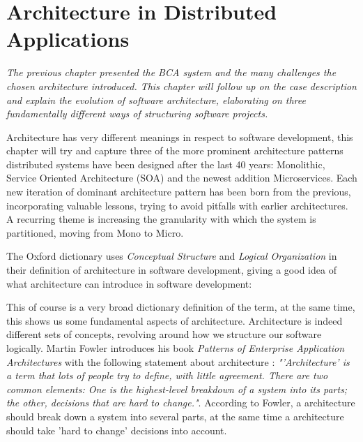 \chapter{Architecture in Distributed Applications}
\label{ch:architecture}

\textit{The previous chapter presented the BCA system and the many challenges the chosen architecture introduced. This chapter will follow up on the case description and explain the evolution of software architecture, elaborating on three fundamentally different ways of structuring software projects.}

Architecture has very different meanings in respect to software development, this chapter will try and capture three of the more prominent architecture patterns distributed systems have been designed after the last 40 years: Monolithic, Service Oriented Architecture (SOA) and the newest addition Microservices. Each new iteration of dominant architecture pattern has been born from the previous, incorporating valuable lessons, trying to avoid pitfalls with earlier architectures. A recurring theme is increasing the granularity with which the system is partitioned, moving from Mono to Micro.

The Oxford dictionary uses \textit{Conceptual Structure} and \textit{Logical Organization} in their definition of architecture in software development, giving a good idea of what architecture can introduce in software development:
 
 
This of course is a very broad dictionary definition of the term, at the same time, this shows us some fundamental aspects of architecture. Architecture is indeed different sets of concepts, revolving around how we structure our software logically. Martin Fowler introduces his book \textit{Patterns of Enterprise Application Architectures} with the following statement about architecture \cite[p.~1]{fowler2002patterns}: \textit{"'Architecture' is a term that lots of people try to define, with little agreement. There are two common elements: One is the highest-level breakdown of a system into its parts; the other, decisions that are hard to change."}. According to Fowler, a architecture should break down a system into several parts, at the same time a architecture should take 'hard to change' decisions into account. 

